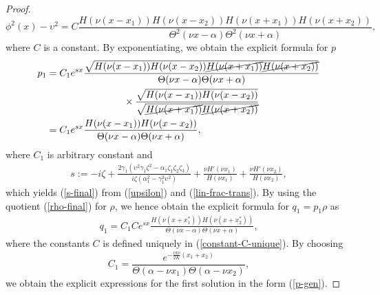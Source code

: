 \documentclass[12pt,reqno]{amsart}
\numberwithin{equation}{section}
\begin{document}
\begin{proof}
\begin{equation}
\label{phi-squared-1}
\phi^2(x) - \upsilon^2 = C \frac{H(\nu (x-x_1)) H(\nu (x-x_2)) H(\nu (x+x_1)) H(\nu (x+x_2))}{\Theta^2(\nu x - \alpha) \Theta^2(\nu x + \alpha)},
\end{equation}
where $C$ is a constant. 
By exponentiating, we obtain the explicit formula for $p$ 
\begin{align}
p_1 &= C_1 e^{s x} \frac{\sqrt{H(\nu (x-x_1)) H(\nu (x-x_2)) 	\cancel{H(\nu (x+x_1))} 	\cancel{H(\nu (x+x_2))}}}{\Theta(\nu x - \alpha) \Theta(\nu x + \alpha)} \notag \\
& \qquad \qquad \qquad \qquad
\times \frac{\sqrt{H(\nu (x-x_1)) H(\nu (x-x_2))}}{\sqrt{	\cancel{H(\nu (x+x_1))} 	\cancel{H(\nu (x+x_2))}}} \notag \\
&= C_1 e^{s x}  \frac{H(\nu (x-x_1)) H(\nu (x-x_2))}{\Theta(\nu x - \alpha) \Theta(\nu x + \alpha)}, \label{p-1}
\end{align}
where $C_1$ is arbitrary constant and 
\begin{align*}
s := -i\zeta + \frac{2 \gamma_1 (\upsilon^2 \gamma_1 \zeta^2 - \alpha_1 \zeta_1 \zeta_2 \zeta_3)}{i \zeta (\alpha_1^2 - \gamma_1^2 \upsilon^2)} + \frac{\nu H'(\nu x_1)}{H(\nu x_1)} + \frac{\nu H'(\nu x_2)}{H(\nu x_2)},
\end{align*}
which yields (\ref{s-final}) from (\ref{upsilon}) and (\ref{lin-frac-trans}).
By using the quotient (\ref{rho-final}) for $\rho$, we hence obtain the explicit formula for $q_1 = p_1 \rho$ as 
\begin{align}
q_1 = C_1 C e^{s x}  \frac{H(\nu (x+x_1^*)) H(\nu (x+x_2^*))}{\Theta(\nu x - \alpha) \Theta(\nu x + \alpha)}, \label{q-1}
\end{align}
where the constants $C$ is defined uniquely in (\ref{constant-C-unique}). 
By choosing 
$$
C_1 = \frac{e^{-\frac{i\pi \nu}{2K} (x_1 + x_2)}}{\Theta(\alpha - \nu x_1) \Theta(\alpha - \nu x_2)} , 
$$
we obtain the explicit expressions for the first solution in the form (\ref{p-gen}).



\end{proof}
\end{document}
